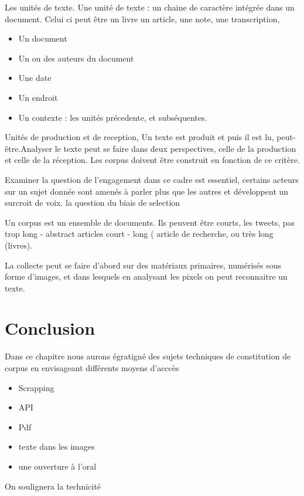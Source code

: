 \documentclass[
]{book}
\providecommand{\tightlist}{%
  \setlength{\itemsep}{0pt}\setlength{\parskip}{0pt}}
\begin{document}
Les unités de texte. Une unité de texte : un chaine de caractère intégrée dans un document. Celui ci peut être un livre un article, une note, une transcription,

\begin{itemize}
\tightlist
\item
  Un document
\item
  Un ou des auteurs du document
\item
  Une date
\item
  Un endroit
\item
  Un contexte : les unités précedente, et subséquentes.
\end{itemize}

Unités de production et de reception, Un texte est produit et puis il est lu, peut-être.Analyser le texte peut se faire dans deux perspectives, celle de la production et celle de la réception. Les corpus doivent être construit en fonction de ce critère.

Examiner la question de l'engagement dans ce cadre est essentiel, certains acteurs sur un sujet donnée sont amenés à parler plus que les autres et développent un surcroit de voix. la question du biais de selection

Un corpus est un ensemble de documents. Ils peuvent être courts, les tweets, pas trop long - abstract articles court - long ( article de recherche, ou très long (livres).

La collecte peut se faire d'abord sur des matériaux primaires, numérisés sous forme d'images, et dans lesquels en analysant les pixels on peut reconnaitre un texte.

\hypertarget{conclusion-1}{%
\section{Conclusion}\label{conclusion-1}}

Dans ce chapitre nous aurons égratigné des sujets techniques de constitution de corpus en envisageant différents moyens d'acccès

\begin{itemize}
\tightlist
\item
  Scrapping
\item
  API
\item
  Pdf
\item
  texte dans les images
\item
  une ouverture à l'oral
\end{itemize}

On soulignera la technicité
\end{document}
